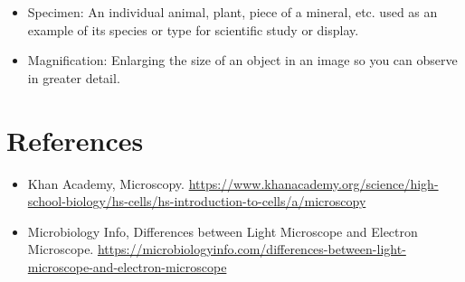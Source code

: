 \documentclass[a0paper,fleqn]{betterposter}
\begin{document}
{\begin{itemize}
\item Specimen: An individual animal, plant, piece of a mineral, etc. used as an example of its species or type for scientific study or display.

\item Magnification: Enlarging the size of an object in an image so you can observe in greater detail.

\end{itemize}

\section{References}
\begin{itemize}
\item Khan Academy, Microscopy.
\Huge \href{https://www.khanacademy.org/science/high-school-biology/hs-cells/hs-introduction-to-cells/a/microscopy}{https://www.khanacademy.org/science/high-school-biology/hs-cells/hs-introduction-to-cells/a/microscopy}
 
\item Microbiology Info, Differences between Light Microscope and Electron Microscope.
\Huge \href{https://microbiologyinfo.com/differences-between-light-microscope-and-electron-microscope/}{https://microbiologyinfo.com/differences-between-light-microscope-and-electron-microscope} 
\end{itemize}
}
\end{document}
